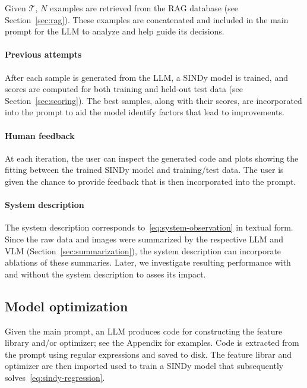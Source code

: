 \documentclass{article}
\begin{document}
Given $\mathcal{T}$, $N$ examples are retrieved from the RAG database (see Section~\ref{sec:rag}).
These examples are concatenated and included in the main prompt for the LLM to analyze and help guide its decisions.

\paragraph{Previous attempts}

After each sample is generated from the LLM, a SINDy model is trained, and scores are computed for both training and held-out test data (see Section~\ref{sec:scoring}). 
The best samples, along with their scores, are incorporated into the prompt to aid the model identify factors that lead to improvements. 

\paragraph{Human feedback}

At each iteration, the user can inspect the generated code and plots showing the fitting between the trained SINDy model and training/test data. 
The user is given the chance to provide feedback that is then incorporated into the prompt.

\paragraph{System description}

The system description corresponds to~\eqref{eq:system-observation} in textual form. 
Since the raw data and images were summarized by the respective LLM and VLM (Section~\ref{sec:summarization}), the system description can incorporate ablations of these summaries.
Later, we investigate resulting performance with and without the system description to asses its impact.

\subsection{Model optimization}

Given the main prompt, an LLM produces code for constructing the feature library and/or optimizer; see the Appendix for examples.
Code is extracted from the prompt using regular expressions and saved to disk. 
The feature librar and optimizer are then imported used to train a SINDy model that subsequently solves~\eqref{eq:sindy-regression}.
\end{document}
